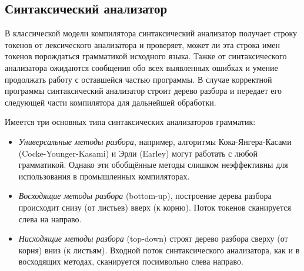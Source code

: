 \subsection{Синтаксический анализатор} \label{sub113}

В классической модели компилятора синтаксический анализатор получает строку токенов от лексического анализатора и проверяет, может ли эта строка имен токенов порождаться грамматикой исходного языка. Тажке от синтаксического анализатора ожидаются сообщения обо всех выявленных ошибках и умение продолжать работу с оставшейся частью программы. В случае корректной программы синтаксический анализатор строит дерево разбора и передает его следующей части компилятора для дальнейшей обработки.

Имеется три основных типа синтаксических анализаторов грамматик: 

\begin{itemize} 
	\item{\textit{Универсальные методы разбора}, например, алгоритмы Кока-Янгера-Касами (Cocke-Younger-Kasami) и Эрли (Earley) могут работать с любой грамматикой. Однако эти обобщённые методы слишком неэффективны для использования в промышленных компиляторах. }
	\item{\textit{Восходящие методы разбора} (bottom-up), построение дерева разбора происходит снизу (от листьев) вверх (к корню). Поток токенов сканируется слева на направо. }
	\item{\textit{Нисходящие методы разбора} (top-down) строят дерево разбора сверху (от корня) вниз (к листьям). Входной поток синтаксического анализатора, как и в восходящих методах, сканируется посимвольно слева направо. }
\end{itemize}
